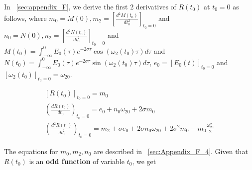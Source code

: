 \documentclass[11pt]{elsarticle}
\begin{document}

In ~\ref{sec:appendix_F}, we derive the first 2 derivatives of $R(t_0)$ at $t_0=0$ as follows, where $m_0= M(0), m_2=[ \frac{d^2M(t_0)}{dt_0^2}]_{t_0=0}$ and $n_0= N(0), n_2=[ \frac{d^2N(t_0)}{dt_0^2}]_{t_0=0}$ and $ M(t_0) = \int_{-\infty}^{0}    E_0(\tau) e^{-2 \sigma \tau} \cos{ (\omega_2(t_0) \tau)} d\tau $ and $ N(t_0) = \int_{-\infty}^{0}    E_0(\tau) e^{-2 \sigma \tau} \sin{ (\omega_2(t_0) \tau)} d\tau $, $e_0= [E_0(t)]_{t_0=0}$ and $[\omega_{2}(t_0)]_{t_0=0}=\omega_{20}$. 



\begin{eqnarray*}\label{sec_2_2_eq_1} 
[ R(t_0) ]_{t_0=0} = m_0 \\
(\frac{dR(t_0)}{dt_0})_{t_0=0} =   e_0  + n_0  \omega_{20} + 2 \sigma m_0 \\
(\frac{d^2R(t_0)}{dt_0^2})_{t_0=0} =   m_2 + \sigma e_0  +2 \sigma n_0  \omega_{20}   + 2 \sigma^{2} m_0 - m_0 \frac{\omega_{20}^2}{2} 
\end{eqnarray*}
\begin{equation} \end{equation}

The equations for $m_0, m_2, n_0$  are described in ~\ref{sec:Appendix_F_4}. Given that $R(t_0)$ is an \textbf{odd function} of variable $t_0$, we get 
\end{document}
